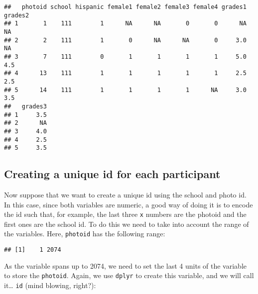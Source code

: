 \documentclass[]{book}
\newenvironment{Shaded}{\begin{snugshade}}{\end{snugshade}}
\newcommand{\KeywordTok}[1]{\textcolor[rgb]{0.13,0.29,0.53}{\textbf{#1}}}
\newcommand{\DataTypeTok}[1]{\textcolor[rgb]{0.13,0.29,0.53}{#1}}
\newcommand{\DecValTok}[1]{\textcolor[rgb]{0.00,0.00,0.81}{#1}}
\newcommand{\StringTok}[1]{\textcolor[rgb]{0.31,0.60,0.02}{#1}}
\newcommand{\OperatorTok}[1]{\textcolor[rgb]{0.81,0.36,0.00}{\textbf{#1}}}
\newcommand{\NormalTok}[1]{#1}
\theoremstyle{definition}
\theoremstyle{definition}
\theoremstyle{definition}
\theoremstyle{remark}
\begin{document}
\begin{verbatim}
##   photoid school hispanic female1 female2 female3 female4 grades1 grades2
## 1       1    111        1      NA      NA       0       0      NA      NA
## 2       2    111        1       0      NA      NA       0     3.0      NA
## 3       7    111        0       1       1       1       1     5.0     4.5
## 4      13    111        1       1       1       1       1     2.5     2.5
## 5      14    111        1       1       1       1      NA     3.0     3.5
##   grades3
## 1     3.5
## 2      NA
## 3     4.0
## 4     2.5
## 5     3.5
\end{verbatim}

\subsection{Creating a unique id for each
participant}\label{creating-a-unique-id-for-each-participant}

Now suppose that we want to create a unique id using the school and
photo id. In this case, since both variables are numeric, a good way of
doing it is to encode the id such that, for example, the last three
\texttt{x} numbers are the photoid and the first ones are the school id.
To do this we need to take into account the range of the variables.
Here, \texttt{photoid} has the following range:

\begin{Shaded}
\end{Shaded}

\begin{verbatim}
## [1]    1 2074
\end{verbatim}

As the variable spans up to 2074, we need to set the last 4 units of the
variable to store the \texttt{photoid}. Again, we use \texttt{dplyr} to
create this variable, and we will call it\ldots{} \texttt{id} (mind
blowing, right?):

\begin{Shaded}
\end{Shaded}
\end{document}
